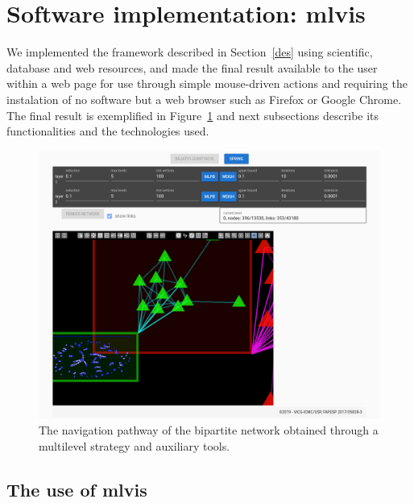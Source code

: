 \documentclass[runningheads]{llncs}
\begin{document}
\noindent 
\section{Software implementation: mlvis}\label{sof}
We implemented the framework described in Section~\ref{des} using scientific,
database and web resources,
and made the final result available to the user within a web page
for use through simple mouse-driven actions
and requiring the instalation of no software but a web browser such as Firefox or Google Chrome.
The final result is exemplified in Figure~\ref{fpage} and next subsections
describe its functionalities and the technologies used.

\begin{figure}[!h]\centering
 \includegraphics[width=\textwidth]{fpage}
  \caption{The navigation pathway of the bipartite network obtained through a multilevel strategy
  and auxiliary tools.
  }\label{fpage}
\end{figure}

\subsection{The use of mlvis}
\end{document}
